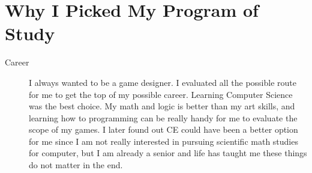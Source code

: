 \documentclass{article}
\begin{document}
\section{Why I Picked My Program of Study}
\label{sec:why-i-picked}
\begin{description}
\item[Career] I always wanted to be a game designer. I evaluated all the
  possible route for me to get the top of my possible career. Learning
  Computer Science was the best choice. My math and logic is better
  than my art skills, and learning how to programming can be really
  handy for me to evaluate the scope of my games. I later found out CE
  could have been a better option for me since I am not really
  interested in pursuing scientific math studies for computer, but I
  am already a senior and life has taught me these things do not
  matter in the end.
\end{description}
\end{document}
